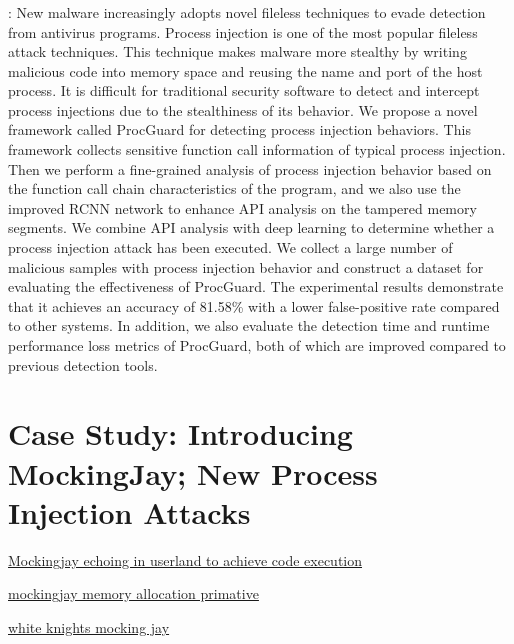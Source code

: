 \documentclass{article}
\begin{document}
\subsubsection{\textcite{Wang:2022}}
\textbf{}: New malware increasingly adopts novel fileless techniques to evade detection from antivirus programs. Process injection is one of the most popular fileless attack techniques. This technique makes malware more stealthy by writing malicious code into memory space and reusing the name and port of the host process. It is difficult for traditional security software to detect and intercept process injections due to the stealthiness of its behavior. We propose a novel framework called ProcGuard for detecting process injection behaviors. This framework collects sensitive function call information of typical process injection. Then we perform a fine-grained analysis of process injection behavior based on the function call chain characteristics of the program, and we also use the improved RCNN network to enhance API analysis on the tampered memory segments. We combine API analysis with deep learning to determine whether a process injection attack has been executed. We collect a large number of malicious samples with process injection behavior and construct a dataset for evaluating the effectiveness of ProcGuard. The experimental results demonstrate that it achieves an accuracy of 81.58\% with a lower false-positive rate compared to other systems. In addition, we also evaluate the detection time and runtime performance loss metrics of ProcGuard, both of which are improved compared to previous detection tools.

\section{Case Study: Introducing MockingJay; New Process Injection Attacks}


\href{https://www.securityjoes.com/post/process-mockingjay-echoing-rwx-in-userland-to-achieve-code-execution}{Mockingjay echoing in userland to achieve code execution}

\href{https://www.linkedin.com/posts/john-stigerwalt-90a9b4110_mockingjay-memory-allocation-primitive-activity-7083050050158743552-Hgyw}{mockingjay memory allocation primative}

\href{https://whiteknightlabs.com/2023/07/06/mockingjay-memory-allocation-primitive/}{white knights mocking jay}
\end{document}
